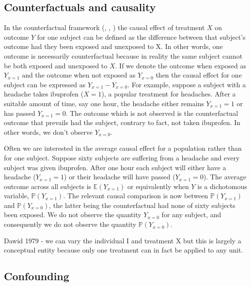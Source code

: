 \documentclass[11pt]{article}
\begin{document}
    \subsection{Counterfactuals and
causality}\label{counterfactuals-and-causality}

In the counterfactual framework (\citet{Neyman1923}, \citet{Rubin1978},
\citet{Robins1986}) the causal effect of treatment \(X\) on outcome
\(Y\) for one subject can be defined as the difference between that
subject's outcome had they been exposed and unexposed to X. In other
words, one outcome is necessarily counterfactual because in reality the
same subject cannot be both exposed and unexposed to \(X\). If we denote
the outcome when exposed as \(Y_{x=1}\) and the outcome when not exposed
as \(Y_{x=0}\) then the causal effect for one subject can be expressed
as \(Y_{x=1} - Y_{x=0}\). For example, suppose a subject with a headache
takes ibuprofen (\(X = 1\)), a popular treatment for headaches. After a
suitable amount of time, say one hour, the headache either remains
\(Y_{x=1} = 1\) or has passed \(Y_{x=1} = 0\). The outcome which is not
observed is the counterfactual outcome that prevails had the subject,
contrary to fact, not taken ibuprofen. In other words, we don't observe
\(Y_{x=0}\). \linebreak

Often we are interested in the average causal effect for a population
rather than for one subject. Suppose sixty subjects are suffering from a
headache and every subject was given ibuprofen. After one hour each
subject will either have a headache (\(Y_{x=1}=1\)) or their headache
will have passed (\(Y_{x=1}=0\)). The average outcome across all
subjects is \(\mathbb{E}(Y_{x = 1})\) or equivalently when \(Y\) is a
dichotomous variable, \(\mathbb{P}(Y_{x = 1})\). The relevant causal
comparison is now between \(\mathbb{P}(Y_{x = 1})\) and
\(\mathbb{P}(Y_{x = 0})\), the latter being the counterfactual had none
of sixty subjects been exposed. We do not observe the quantity
\(Y_{x=0}\) for any subject, and consequently we do not observe the
quantity \(\mathbb{P}(Y_{x = 0})\). \linebreak

Dawid 1979 - we can vary the individual I and treatment X but this is
largely a conceptual entity because only one treatment can in fact be
applied to any unit.

    \subsection{Confounding}\label{confounding}
\end{document}
